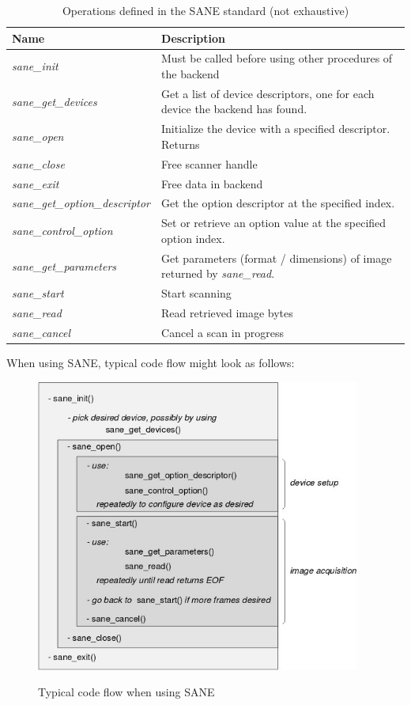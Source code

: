 \documentclass{article}
\begin{document}
\begin{table}[H]
  \caption{Operations defined in the SANE standard (not exhaustive) \cite[4.3]{sane_standard}}
  \centering
  \begin{tabular}{l | p{8cm}}
    Name & Description \\ \hline
    \it sane\_init & Must be called before using other procedures of the backend \\
    \it sane\_get\_devices & Get a list of device descriptors, one for each device
                             the backend has found. \\
    \it sane\_open & Initialize the device with a specified descriptor. Returns \\
    \it sane\_close & Free scanner handle \\
    \it sane\_exit & Free data in backend \\
    \it sane\_get\_option\_descriptor & Get the option descriptor at the specified index. \\
    \it sane\_control\_option & Set or retrieve an option value at the specified option index. \\
    \it sane\_get\_parameters & Get parameters (format / dimensions) of image returned by {\it sane\_read}. \\
    \it sane\_start & Start scanning \\
    \it sane\_read & Read retrieved image bytes \\
    \it sane\_cancel & Cancel a scan in progress \\
  \end{tabular}
\end{table}

When using SANE, typical code flow might look as follows:

\begin{figure}[H]
  \caption{Typical code flow when using SANE \cite[4.4]{sane_standard}}
  \centering
  \includegraphics[width=0.95\textwidth]{images/sane_codeflow.jpg}
  \label{sane_codeflow}
\end{figure}
\end{document}
